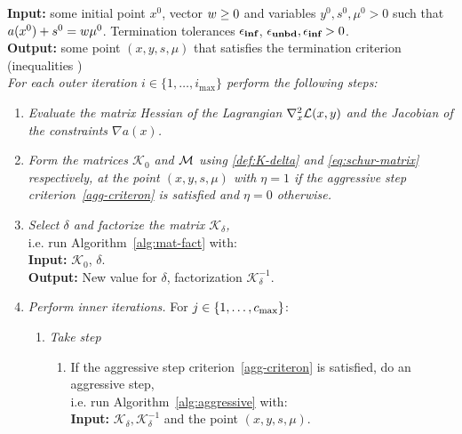\documentclass{article}
\begin{document}
\begin{algorithm}[H]
\textbf{Input:} some initial point $x^{0}$, vector $w \ge 0$ and variables $y^{0}, s^{0}, \mu^0 > 0$  such that $a(x^{0}) + s^{0} = w \mu^{0}$. Termination tolerances $\epsilon_{\textbf{inf}}$, $\epsilon_{\textbf{unbd}}, \epsilon_{\textbf{inf}} > 0$. \\
\textbf{Output:} some point $(x, y, s, \mu)$ that satisfies the termination criterion (inequalities \termination{}) 
\vspace{0.1 cm} \\
\emph{For each outer iteration $i \in \{1, \dots, i_{\max}\}$ perform the following steps:}
\begin{enumerate}[label*=A.{\arabic*}]
\item \label{step-1}  \emph{Evaluate the matrix Hessian of the Lagrangian $\nabla^2_{x} \mathcal{L}(x,y)$ and the Jacobian of the constraints $\nabla a(x)$.}
\item \label{line:form-K}  \emph{Form the matrices $\mathcal{K}_{0}$ and $\mathcal{M}$ using \eqref{def:K-delta} and \eqref{eq:schur-matrix} respectively, at the point $(x, y, s, \mu)$ with $\eta = 1$ if the aggressive step criterion~\eqref{agg-criteron} is satisfied and $\eta = 0$ otherwise.}
\item \emph{Select $\delta$ and factorize the matrix $\mathcal{K}_{\delta}$,} \\
i.e. run Algorithm~\ref{alg:mat-fact} with: \\
\hspace*{0.1cm}  \textbf{Input:} $\mathcal{K}_{0}$, $\delta$. \\
\hspace*{0.1cm} \textbf{Output:} New value for $\delta$, factorization $\mathcal{K}_{\delta}^{-1}$.
\item \label{take-steps}  \emph{Perform inner iterations.} For $j \in \{ 1, \dots , c_{\max} \}$:
\begin{enumerate}[label*=.{\arabic*}]
\item \emph{Take step}\label{line:take-step}
\begin{enumerate}[label=-Case-{\Roman*}]
\item If the aggressive step criterion~\eqref{agg-criteron} is satisfied, do an aggressive step, \\
i.e. run Algorithm~\ref{alg:aggressive} with: \\
\hspace*{0.1cm}  \textbf{Input:} $\mathcal{K}_{\delta}, \mathcal{K}_{\delta}^{-1}$ and the point $(x,y,s, \mu)$. \\

\end{enumerate}
\end{enumerate}
\end{enumerate}
\end{algorithm}
\end{document}
